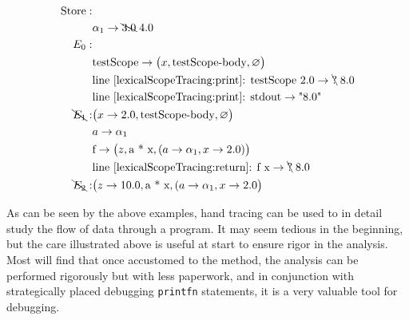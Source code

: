 \begin{align*}
  \text{Store}: &\\
  & \alpha_1 \rightarrow \bcancel{3.0}\; 4.0\\
  E_0:&\\
      &\text{testScope} \rightarrow \big(x, \text{testScope-body}, \varnothing\big)\\
      & \text{line~\ref{lexicalScopeTracing:print}: testScope 2.0} \rightarrow \bcancel{\text{?}}\; 8.0\\
      & \text{line~\ref{lexicalScopeTracing:print}: stdout} \rightarrow \text{"8.0"}\\
  \bcancel{E_1}: & \big(x\rightarrow 2.0, \text{testScope-body}, \varnothing\big)\\
      & a \rightarrow \alpha_1\\
      & \text{f} \rightarrow \big(z, \text{a * x}, (a \rightarrow \alpha_1, x\rightarrow 2.0)\big)\\
      & \text{line~\ref{lexicalScopeTracing:return}: f x} \rightarrow \bcancel{\text{?}}\; 8.0\\
  \bcancel{E_2}: & \big(z \rightarrow 10.0, \text{a * x}, (a \rightarrow \alpha_1, x\rightarrow 2.0\big)\\
\end{align*}

As can be seen by the above examples, hand tracing can be used to in detail study the flow of data through a program. It may seem tedious in the beginning, but the care illustrated above is useful at start to ensure rigor in the analysis. Most will find that once accustomed to the method, the analysis can be performed rigorously but with less paperwork, and in conjunction with strategically placed debugging \lstinline!printfn! statements, it is a very valuable tool for debugging.



